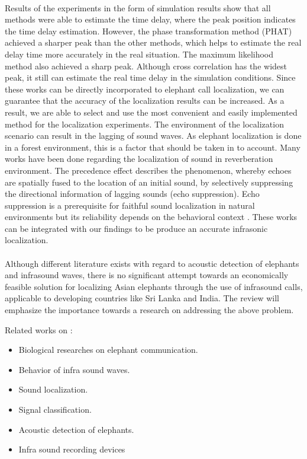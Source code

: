 \documentclass[11pt]{article}
\numberwithin{figure}{section}
\numberwithin{table}{section}
\begin{document}
\paragraph{}
Results of the experiments in the form of simulation results \cite {26} show that all methods were able to estimate the time delay, where the peak position indicates the time delay estimation. However, the phase transformation method (PHAT) achieved a sharper peak than the other methods, which helps to estimate the real delay time more accurately in the real situation. The maximum likelihood method also achieved a sharp peak. Although cross correlation has the widest peak, it still can estimate the real time delay in the simulation conditions. Since these works can be directly incorporated to elephant call localization, we can guarantee that the accuracy of the localization results can be increased. As a result, we are able to select and use the most convenient and easily implemented method for the localization experiments. The environment of the localization scenario can result in the lagging of sound waves. As elephant localization is done in a forest environment, this is a factor that should be taken in to account. Many works have been done regarding the localization of sound in reverberation environment. The precedence effect describes the phenomenon, whereby echoes are spatially fused to the location of an initial sound, by selectively suppressing the directional information of lagging sounds (echo suppression). Echo suppression is a prerequisite for faithful sound localization in natural environments but its reliability depends on the behavioral context \cite {27}. These works can be integrated with our findings to be produce an accurate infrasonic localization. 

\paragraph{}
Although different literature exists with regard to acoustic detection of elephants and infrasound waves, there is no significant attempt towards an economically feasible solution for localizing Asian elephants through the use of infrasound calls, applicable to developing countries like Sri Lanka and India. The review will emphasize the importance towards a research on addressing the above problem.


Related works on :
\begin{itemize}
  \item Biological researches on elephant communication. 
  \item Behavior of infra sound waves.
  \item Sound localization.
  \item Signal classification.
  \item Acoustic detection of elephants.
  \item Infra sound recording devices
\end{itemize}
\end{document}
